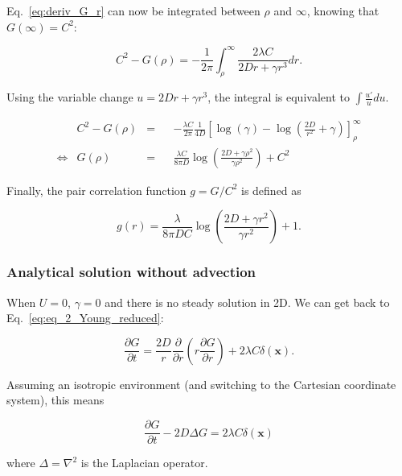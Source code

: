 Eq.~\ref{eq:deriv_G_r} can now be integrated between $\rho$ and $\infty$, knowing that $G(\infty)=C^{2}$:

\begin{equation}
 C^{2}-G(\rho) = -\frac{1}{2\pi}{\displaystyle \int_{\rho}^{\infty}}\frac{2\lambda C}{2Dr+\gamma r^{3}}dr.\label{eq:deriv_G_r_int1}
\end{equation}

Using the variable change $u=2Dr+\gamma r^{3}$, the integral is equivalent
to $\int\frac{u'}{u}du$.

\begin{align}
 & C^{2}-G(\rho) & = & & -\frac{\lambda C}{2\pi}\frac{1}{4D}\left[\log(\gamma)-\log\left(\frac{2D}{r^{2}}+\gamma\right)\right]_{\rho}^{\infty}\label{eq:deriv_G_rint2}\\
\Leftrightarrow & G(\rho) & = & & \frac{\lambda C}{8\pi D}\log\left(\frac{2D+\gamma \rho^{2}}{\gamma \rho^{2}}\right)+C^{2}\label{eq:G_rho}
\end{align}

Finally, the pair correlation function $g=G/C^{2}$ is defined as

\begin{equation}
g(r)=\frac{\lambda}{8\pi DC}\log\left(\frac{2D+\gamma r^{2}}{\gamma r^{2}}\right)+1.
\end{equation}

\subsubsection*{Analytical solution without advection}

When $U=0$, $\gamma=0$ and there is no steady solution in 2D. We can get back to Eq.~\ref{eq:eq_2_Young_reduced}:

\begin{equation}
\frac{\partial G}{\partial t}=\frac{2D}{r}\frac{\partial}{\partial r}\left(r\frac{\partial G}{\partial r}\right)+2\lambda C\delta(\boldsymbol{x}).\label{eq:g_without_advection}
\end{equation}

Assuming an isotropic environment (and switching to the Cartesian coordinate system), this means

\begin{equation}
\frac{\partial G}{\partial t}-2D\Delta G=2\lambda C\delta(\boldsymbol{x})
\end{equation}

where $\Delta=\nabla^{2}$ is the Laplacian operator. \\

